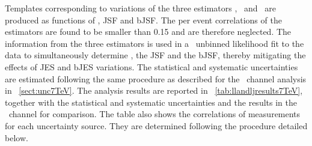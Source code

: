Templates corresponding to variations of the three estimators \mtr, \mWr\ and \rbqr\ are produced as functions of \mt, \gls{JSF} and \gls{bJSF}. 
%
The per event correlations of the estimators are found to be smaller than 0.15 and are therefore neglected. 
%
The information from the three estimators is used in a \threed\ unbinned likelihood fit to the data to simultaneously determine \mt, the \gls{JSF} and the \gls{bJSF}, thereby mitigating the effects of \gls{JES} and \gls{bJES} variations. 
%
The statistical and systematic uncertainties are estimated following the same procedure as described for the \dil\ channel analysis in \sect~\ref{sect:unc7TeV}. 
%
The analysis results are reported in \tab~\ref{tab:llandljresults7TeV}, together with the statistical and systematic uncertainties and the results in the \dil\ channel for comparison. The table also shows the correlations of measurements for each uncertainty source. They are determined following the procedure detailed below. 







